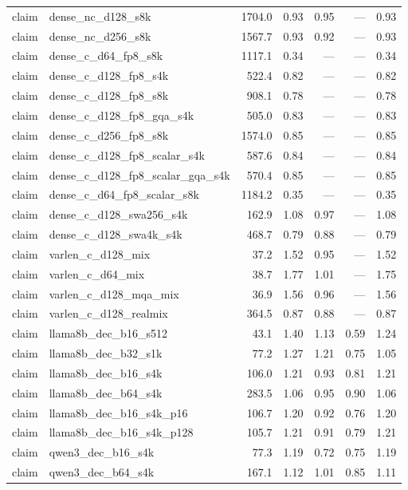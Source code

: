 \begin{longtable}{@{}llrrrrr@{}}
claim & dense\_nc\_d128\_s8k & 1704.0 & 0.93 & 0.95 & --- & 0.93 \\
claim & dense\_nc\_d256\_s8k & 1567.7 & 0.93 & 0.92 & --- & 0.93 \\
claim & dense\_c\_d64\_fp8\_s8k & 1117.1 & 0.34 & --- & --- & 0.34 \\
claim & dense\_c\_d128\_fp8\_s4k & 522.4 & 0.82 & --- & --- & 0.82 \\
claim & dense\_c\_d128\_fp8\_s8k & 908.1 & 0.78 & --- & --- & 0.78 \\
claim & dense\_c\_d128\_fp8\_gqa\_s4k & 505.0 & 0.83 & --- & --- & 0.83 \\
claim & dense\_c\_d256\_fp8\_s8k & 1574.0 & 0.85 & --- & --- & 0.85 \\
claim & dense\_c\_d128\_fp8\_scalar\_s4k & 587.6 & 0.84 & --- & --- & 0.84 \\
claim & dense\_c\_d128\_fp8\_scalar\_gqa\_s4k & 570.4 & 0.85 & --- & --- & 0.85 \\
claim & dense\_c\_d64\_fp8\_scalar\_s8k & 1184.2 & 0.35 & --- & --- & 0.35 \\
claim & dense\_c\_d128\_swa256\_s4k & 162.9 & 1.08 & 0.97 & --- & 1.08 \\
claim & dense\_c\_d128\_swa4k\_s4k & 468.7 & 0.79 & 0.88 & --- & 0.79 \\
claim & varlen\_c\_d128\_mix & 37.2 & 1.52 & 0.95 & --- & 1.52 \\
claim & varlen\_c\_d64\_mix & 38.7 & 1.77 & 1.01 & --- & 1.75 \\
claim & varlen\_c\_d128\_mqa\_mix & 36.9 & 1.56 & 0.96 & --- & 1.56 \\
claim & varlen\_c\_d128\_realmix & 364.5 & 0.87 & 0.88 & --- & 0.87 \\
claim & llama8b\_dec\_b16\_s512 & 43.1 & 1.40 & 1.13 & 0.59 & 1.24 \\
claim & llama8b\_dec\_b32\_s1k & 77.2 & 1.27 & 1.21 & 0.75 & 1.05 \\
claim & llama8b\_dec\_b16\_s4k & 106.0 & 1.21 & 0.93 & 0.81 & 1.21 \\
claim & llama8b\_dec\_b64\_s4k & 283.5 & 1.06 & 0.95 & 0.90 & 1.06 \\
claim & llama8b\_dec\_b16\_s4k\_p16 & 106.7 & 1.20 & 0.92 & 0.76 & 1.20 \\
claim & llama8b\_dec\_b16\_s4k\_p128 & 105.7 & 1.21 & 0.91 & 0.79 & 1.21 \\
claim & qwen3\_dec\_b16\_s4k & 77.3 & 1.19 & 0.72 & 0.75 & 1.19 \\
claim & qwen3\_dec\_b64\_s4k & 167.1 & 1.12 & 1.01 & 0.85 & 1.11 \\

\end{longtable}
